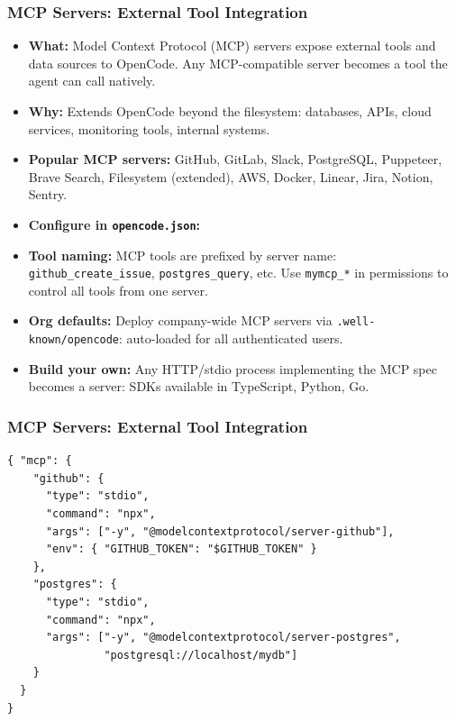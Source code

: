 \begin{frame}[fragile]\frametitle{MCP Servers:  External Tool Integration}
  \begin{itemize}
    \item \textbf{What:} Model Context Protocol (MCP) servers expose external tools and data sources to OpenCode. Any MCP-compatible server becomes a tool the agent can call natively.
    \item \textbf{Why:} Extends OpenCode beyond the filesystem:  databases, APIs, cloud services, monitoring tools, internal systems.
    \item \textbf{Popular MCP servers:} GitHub, GitLab, Slack, PostgreSQL, Puppeteer, Brave Search, Filesystem (extended), AWS, Docker, Linear, Jira, Notion, Sentry.
    \item \textbf{Configure in \texttt{opencode.json}:}
    \item \textbf{Tool naming:} MCP tools are prefixed by server name: \texttt{github\_create\_issue}, \texttt{postgres\_query}, etc. Use \texttt{mymcp\_*} in permissions to control all tools from one server.
    \item \textbf{Org defaults:} Deploy company-wide MCP servers via \texttt{.well-known/opencode}:  auto-loaded for all authenticated users.
    \item \textbf{Build your own:} Any HTTP/stdio process implementing the MCP spec becomes a server:  SDKs available in TypeScript, Python, Go.
  \end{itemize}
  
\end{frame}

\begin{frame}[fragile]\frametitle{MCP Servers:  External Tool Integration}

\begin{lstlisting}
{ "mcp": {
    "github": {
      "type": "stdio",
      "command": "npx",
      "args": ["-y", "@modelcontextprotocol/server-github"],
      "env": { "GITHUB_TOKEN": "$GITHUB_TOKEN" }
    },
    "postgres": {
      "type": "stdio",
      "command": "npx",
      "args": ["-y", "@modelcontextprotocol/server-postgres",
               "postgresql://localhost/mydb"]
    }
  }
}
\end{lstlisting}  
\end{frame}

